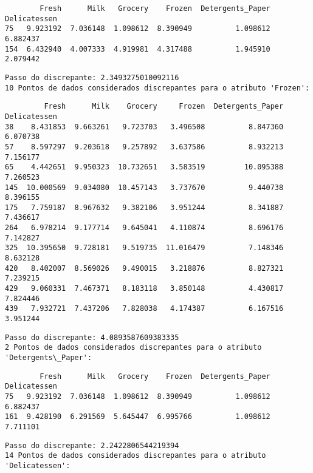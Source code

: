 \documentclass[11pt]{article}
\begin{document}
    
    \begin{verbatim}
        Fresh      Milk   Grocery    Frozen  Detergents_Paper  Delicatessen
75   9.923192  7.036148  1.098612  8.390949          1.098612      6.882437
154  6.432940  4.007333  4.919981  4.317488          1.945910      2.079442
    \end{verbatim}

    
    \begin{Verbatim}[commandchars=\\\{\}]
Passo do discrepante: 2.3493275010092116
10 Pontos de dados considerados discrepantes para o atributo 'Frozen':

    \end{Verbatim}

    
    \begin{verbatim}
         Fresh      Milk    Grocery     Frozen  Detergents_Paper  Delicatessen
38    8.431853  9.663261   9.723703   3.496508          8.847360      6.070738
57    8.597297  9.203618   9.257892   3.637586          8.932213      7.156177
65    4.442651  9.950323  10.732651   3.583519         10.095388      7.260523
145  10.000569  9.034080  10.457143   3.737670          9.440738      8.396155
175   7.759187  8.967632   9.382106   3.951244          8.341887      7.436617
264   6.978214  9.177714   9.645041   4.110874          8.696176      7.142827
325  10.395650  9.728181   9.519735  11.016479          7.148346      8.632128
420   8.402007  8.569026   9.490015   3.218876          8.827321      7.239215
429   9.060331  7.467371   8.183118   3.850148          4.430817      7.824446
439   7.932721  7.437206   7.828038   4.174387          6.167516      3.951244
    \end{verbatim}

    
    \begin{Verbatim}[commandchars=\\\{\}]
Passo do discrepante: 4.0893587609383335
2 Pontos de dados considerados discrepantes para o atributo 'Detergents\_Paper':

    \end{Verbatim}

    
    \begin{verbatim}
        Fresh      Milk   Grocery    Frozen  Detergents_Paper  Delicatessen
75   9.923192  7.036148  1.098612  8.390949          1.098612      6.882437
161  9.428190  6.291569  5.645447  6.995766          1.098612      7.711101
    \end{verbatim}

    
    \begin{Verbatim}[commandchars=\\\{\}]
Passo do discrepante: 2.2422806544219394
14 Pontos de dados considerados discrepantes para o atributo 'Delicatessen':

    \end{Verbatim}
\end{document}
